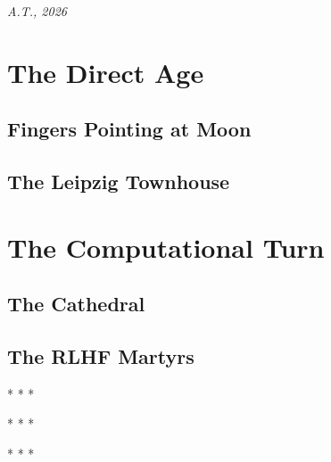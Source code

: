 \documentclass[11pt]{book}
\newcommand{\scenebreak}{\begin{center}* * *\end{center}}
\newcommand{\demotechapters}{%
  \let\savedchapter\chapter
  \renewcommand{\chapter}[1]{}%
}
\begin{document}
\bigskip

\hfill \textit{A.T., 2026}

\cleardoublepage


\part{The Direct Age}

\chapter{Fingers Pointing at Moon}

\cleardoublepage

\chapter{The Leipzig Townhouse}

\cleardoublepage


\part{The Computational Turn}

\chapter{The Cathedral}

\cleardoublepage

\chapter{The RLHF Martyrs}
\demotechapters


\scenebreak



\scenebreak



\scenebreak


\end{document}
